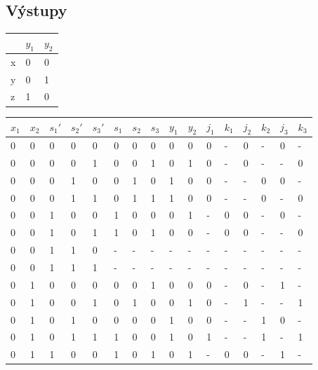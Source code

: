 \documentclass[titlepage]{article}
\begin{document}
\subsection{Výstupy}
\begin{center}
\begin{tabular}{|l|l|l|}
\hline
& {\bf $y_1$} & {\bf $y_2$} \\
\hline
x & 0 & 0 \\
y & 0 & 1 \\
z & 1 & 0 \\
\hline
\end{tabular}
\end{center}


\begin{center}
\begin{tabular}{|l|l|l|l|l|l|l|l|l|l|l|l|l|l|l|l|}
\hline
{\bf $x_1$} & {\bf $x_2$} & {\bf $s_1'$} & {\bf $s_2'$} & {\bf $s_3'$} & {\bf
$s_1$} & {\bf $s_2$} & {\bf $s_3$} & {\bf $y_1$} & {\bf $y_2$} & {\bf $j_1$} & {\bf $k_1$} & {\bf $j_2$} & {\bf $k_2$} & {\bf $j_3$} & {\bf $k_3$}\\
\hline
0 & 0 & 0 & 0 & 0 & 0 & 0 & 0 & 0 & 0 & 0 & - & 0 & - & 0 & - \\
\hline
0 & 0 & 0 & 0 & 1 & 0 & 0 & 1 & 0 & 1 & 0 & - & 0 & - & - & 0 \\
\hline
0 & 0 & 0 & 1 & 0 & 0 & 1 & 0 & 1 & 0 & 0 & - & - & 0 & 0 & - \\
\hline
0 & 0 & 0 & 1 & 1 & 0 & 1 & 1 & 1 & 0 & 0 & - & - & 0 & - & 0 \\
\hline
0 & 0 & 1 & 0 & 0 & 1 & 0 & 0 & 0 & 1 & - & 0 & 0 & - & 0 & - \\
\hline
0 & 0 & 1 & 0 & 1 & 1 & 0 & 1 & 0 & 0 & - & 0 & 0 & - & - & 0 \\
\hline
0 & 0 & 1 & 1 & 0 & - & - & - & - & - & - & - & - & - & - & - \\
\hline
0 & 0 & 1 & 1 & 1 & - & - & - & - & - & - & - & - & - & - & - \\
\hline
0 & 1 & 0 & 0 & 0 & 0 & 0 & 1 & 0 & 0 & 0 & - & 0 & - & 1 & - \\
\hline
0 & 1 & 0 & 0 & 1 & 0 & 1 & 0 & 0 & 1 & 0 & - & 1 & - & - & 1 \\
\hline
0 & 1 & 0 & 1 & 0 & 0 & 0 & 0 & 1 & 0 & 0 & - & - & 1 & 0 & - \\
\hline
0 & 1 & 0 & 1 & 1 & 1 & 0 & 0 & 1 & 0 & 1 & - & - & 1 & - & 1 \\
\hline
0 & 1 & 1 & 0 & 0 & 1 & 0 & 1 & 0 & 1 & - & 0 & 0 & - & 1 & - \\

\end{tabular}
\end{center}
\end{document}
